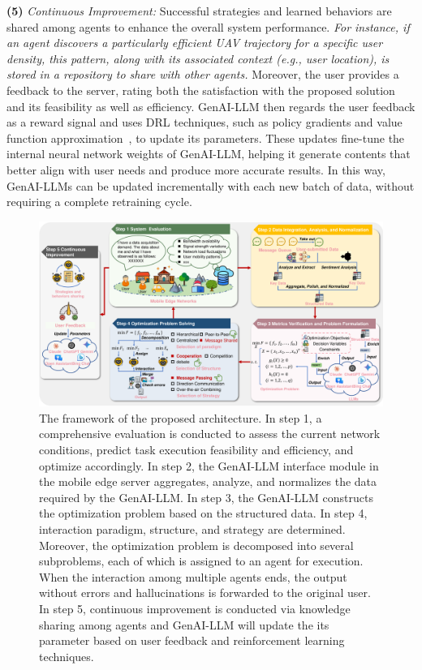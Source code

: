 \documentclass[twoside,11pt]{reviewresponse}
\theoremstyle{plain}
\theoremstyle{plain}
\begin{document}
\par \textbf{(5)} \textit{Continuous Improvement:} Successful strategies and learned behaviors are shared among agents to enhance the overall system performance. \textit{For instance, if an agent discovers a particularly efficient UAV trajectory for a specific user density, this pattern, along with its associated context (e.g., user location), is stored in a repository to share with other agents.} Moreover, the user provides a feedback to the server, rating both the satisfaction with the proposed solution and its feasibility as well as efficiency. GenAI-LLM then regards the user feedback as a reward signal and uses DRL techniques, such as policy gradients and value function approximation~\cite{policy gradient}, to update its parameters. These updates fine-tune the internal neural network weights of GenAI-LLM, helping it generate contents that better align with user needs and produce more accurate results. In this way, GenAI-LLMs can be updated incrementally with each new batch of data, without requiring a complete retraining cycle.


\begin{figure}[H]
\centerline{\includegraphics[width=6in]{figure/The Proposed Architecture.pdf}}
\caption{The framework of the proposed architecture. In step 1, a comprehensive evaluation is conducted to assess the current network conditions, predict task execution feasibility and efficiency, and optimize accordingly. In step 2, the GenAI-LLM interface module in the mobile edge server aggregates, analyze, and normalizes the data required by the GenAI-LLM. In step 3, the GenAI-LLM constructs the optimization problem based on the structured data. In step 4, interaction paradigm, structure, and strategy are determined. Moreover, the optimization problem is decomposed into several subproblems, each of which is assigned to an agent for execution. When the interaction among multiple agents ends, the output without errors and hallucinations is forwarded to the original user. In step 5, continuous improvement is conducted via knowledge sharing among agents and GenAI-LLM will update the its parameter based on user feedback and reinforcement learning techniques.}
\label{fig. sketch map}
\end{figure}
\end{document}
